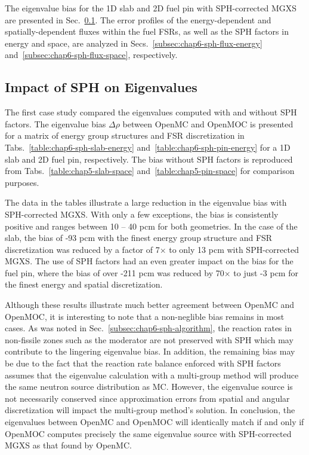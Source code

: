 The eigenvalue bias for the 1D slab and 2D fuel pin with \ac{SPH}-corrected \ac{MGXS} are presented in Sec.~\ref{subsubsec:chap6-sph-eigenvalues}. The error profiles of the energy-dependent and spatially-dependent fluxes within the fuel \ac{FSR}s, as well as the \ac{SPH} factors in energy and space, are analyzed in Secs.~\ref{subsec:chap6-sph-flux-energy} and~\ref{subsec:chap6-sph-flux-space}, respectively.

\subsection{Impact of SPH on Eigenvalues}
\label{subsubsec:chap6-sph-eigenvalues}

The first case study compared the eigenvalues computed with and without \ac{SPH} factors. The eigenvalue bias $\Delta\rho$ between OpenMC and OpenMOC is presented for a matrix of energy group structures and \ac{FSR} discretization in Tabs.~\ref{table:chap6-sph-slab-energy} and~\ref{table:chap6-sph-pin-energy} for a 1D slab and 2D fuel pin, respectively. The bias without \ac{SPH} factors is reproduced from Tabs.~\ref{table:chap5-slab-space} and~\ref{table:chap5-pin-space} for comparison purposes.

The data in the tables illustrate a large reduction in the eigenvalue bias with \ac{SPH}-corrected \ac{MGXS}. With only a few exceptions, the bias is consistently positive and ranges between 10 -- 40 \ac{pcm} for both geometries. In the case of the slab, the bias of -93 \ac{pcm} with the finest energy group structure and \ac{FSR} discretization was reduced by a factor of 7$\times$ to only 13 \ac{pcm} with \ac{SPH}-corrected \ac{MGXS}. The use of \ac{SPH} factors had an even greater impact on the bias for the fuel pin, where the bias of over -211 \ac{pcm} was reduced by 70$\times$ to just -3 \ac{pcm} for the finest energy and spatial discretization. 

Although these results illustrate much better agreement between OpenMC and OpenMOC, it is interesting to note that a non-neglible bias remains in most cases. As was noted in Sec.~\ref{subsec:chap6-sph-algorithm}, the reaction rates in non-fissile zones such as the moderator are not preserved with \ac{SPH} which may contribute to the lingering eigenvalue bias. In addition, the remaining bias may be due to the fact that the reaction rate balance enforced with \ac{SPH} factors assumes that the eigenvalue calculation with a multi-group method will produce the same neutron source distribution as \ac{MC}. However, the eigenvalue source is not necessarily conserved since approximation errors from spatial and angular discretization will impact the multi-group method's solution. In conclusion, the eigenvalues between OpenMC and OpenMOC will identically match if and only if OpenMOC computes precisely the same eigenvalue source with \ac{SPH}-corrected \ac{MGXS} as that found by OpenMC.

